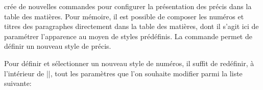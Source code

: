 \frenchlaw crée de nouvelles commandes pour configurer la présentation des précis dans la table des matières. Pour mémoire, il est possible de composer les numéros et titres des paragraphes directement dans la table des matières, dont il s'agit ici de paramétrer l'apparence au moyen de styles prédéfinis. La commande  permet de définir un nouveau style de précis.

\begin{noprint}
\newcommand{\makeprecisstyle}[2]{\expandafter\gdef\csname @precisstyle@#1\endcsname{#2}}
\newcommand{\precisstyle}[1]{\csname @precisstyle@#1\endcsname}
\end{noprint}

Pour définir et sélectionner un nouveau style de numéros, il suffit de redéfinir, à l'intérieur de |\makeparastyle|, tout les paramètres que l'on souhaite modifier parmi la liste suivante:

\begin{macro}
\end{macro}

\begin{noprint}
\newcommand{\cftprecisstyle}{}
\newcommand{\cftprecisnumstyle}{}
\newcommand{\cftprecisaftersnum}{}
\newcommand{\cftprecisnumsep}{}
\newcommand{\cftprecisleader}{}
\newcommand{\cftprecisafterpnum}{}
\newcommand{\cftprecissep}{ }
\end{noprint}


